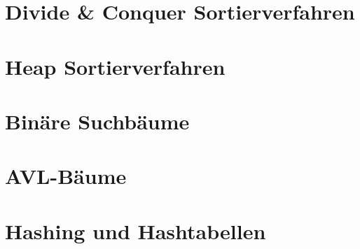 \documentclass[12pt,a4paper]{article}
\begin{document}
\section{Divide \& Conquer Sortierverfahren}

\section{Heap Sortierverfahren}

\section{Binäre Suchbäume}

\section{AVL-Bäume}

\section{Hashing und Hashtabellen}
\end{document}
